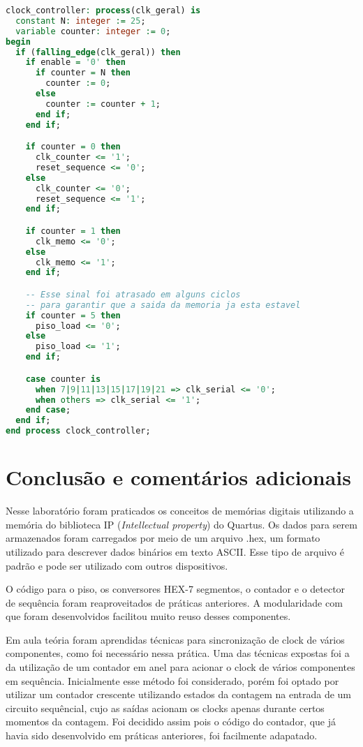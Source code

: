 \documentclass[12pt, a4paper]{article}
\begin{document}
\begin{lstlisting}[language=VHDL]
clock_controller: process(clk_geral) is
  constant N: integer := 25;
  variable counter: integer := 0;
begin
  if (falling_edge(clk_geral)) then
    if enable = '0' then
      if counter = N then
        counter := 0;
      else
        counter := counter + 1;
      end if;
    end if;

    if counter = 0 then
      clk_counter <= '1';
      reset_sequence <= '0';
    else
      clk_counter <= '0';
      reset_sequence <= '1';
    end if;

    if counter = 1 then
      clk_memo <= '0';
    else
      clk_memo <= '1';
    end if;

	-- Esse sinal foi atrasado em alguns ciclos
	-- para garantir que a saida da memoria ja esta estavel
    if counter = 5 then
      piso_load <= '0';
    else
      piso_load <= '1';
    end if;

    case counter is
      when 7|9|11|13|15|17|19|21 => clk_serial <= '0';
      when others => clk_serial <= '1';
    end case;
  end if;
end process clock_controller;
\end{lstlisting}

\newpage
\section{Conclusão e comentários adicionais}

\par Nesse laboratório foram praticados os conceitos de memórias digitais utilizando
a memória do biblioteca IP (\textit{Intellectual property}) do Quartus.
Os dados para serem armazenados foram carregados por meio de um arquivo .hex,
um formato utilizado para descrever dados binários em texto ASCII.
Esse tipo de arquivo é padrão e pode ser utilizado com outros dispositivos.

\par O código para o piso, os conversores HEX-7 segmentos, o contador e o detector de
sequência foram reaproveitados de práticas anteriores. A modularidade com que foram
desenvolvidos facilitou muito reuso desses componentes.

\par Em aula teória foram aprendidas técnicas para sincronização de clock de vários
componentes, como foi necessário nessa prática. Uma das técnicas expostas foi a da
utilização de um contador em anel para acionar o clock de vários componentes em sequência.
Inicialmente esse método foi considerado, porém foi optado por utilizar um contador 
crescente utilizando estados da contagem na entrada de um circuito sequêncial,
cujo as saídas acionam os clocks apenas durante certos momentos da contagem.
Foi decidido assim pois o código do contador, que já havia sido desenvolvido em
práticas anteriores, foi facilmente adapatado.
\end{document}
